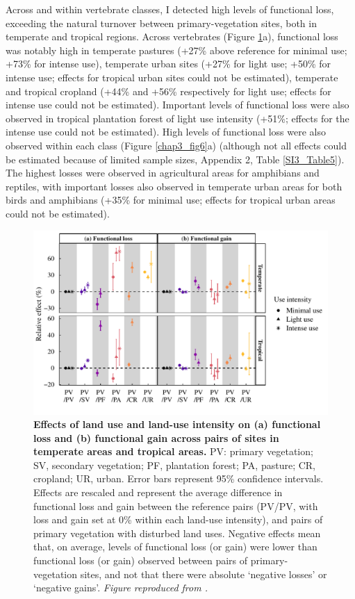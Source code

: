 Across and within vertebrate classes, I detected high levels of functional loss, exceeding the natural turnover between primary-vegetation sites, both in temperate and tropical regions. Across vertebrates (Figure \ref{chap3_fig5}a), functional loss was notably high in temperate pastures (+27\% above reference for minimal use; +73\% for intense use), temperate urban sites (+27\% for light use; +50\% for intense use; effects for tropical urban sites could not be estimated), temperate and tropical cropland (+44\% and +56\% respectively for light use; effects for intense use could not be estimated). Important levels of functional loss were also observed in tropical plantation forest of light use intensity (+51\%; effects for the intense use could not be estimated). High levels of functional loss were also observed within each class (Figure \ref{chap3_fig6}a) (although not all effects could be estimated because of limited sample sizes, Appendix 2, Table \ref{SI3_Table5}). The highest losses were observed in agricultural areas for amphibians and reptiles, with important losses also observed in temperate urban areas for both birds and amphibians (+35\% for minimal use; effects for tropical urban areas could not be estimated).

\begin{figure}[h!]
\centering
\includegraphics[scale=0.75]{figures/Chapter_FD/Figure5}
\caption[Effects of land use and land-use intensity on (a) functional loss and (b) functional gain across pairs of sites in temperate areas and tropical areas.]{\textbf{Effects of land use and land-use intensity on (a) functional loss and (b) functional gain across pairs of sites in temperate areas and tropical areas.} PV: primary vegetation; SV, secondary vegetation; PF, plantation forest; PA, pasture; CR, cropland; UR, urban. Error bars represent 95\% confidence intervals. Effects are rescaled and represent the average difference in functional loss and gain between the reference pairs (PV/PV, with loss and gain set at 0\% within each land-use intensity), and pairs of primary vegetation with disturbed land uses. Negative effects mean that, on average, levels of functional loss (or gain) were lower than functional loss (or gain) observed between pairs of primary-vegetation sites, and not that there were absolute `negative losses' or `negative gains'. \textit{Figure reproduced from \citet{Etard2021}.}}
\label{chap3_fig5}
\end{figure}


